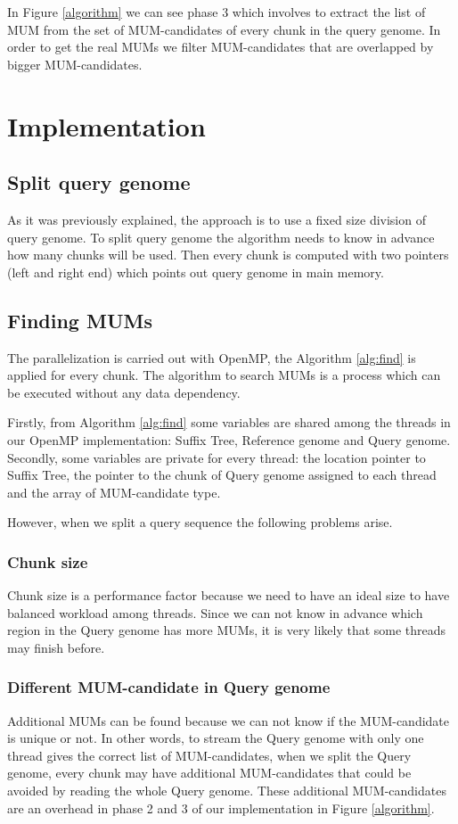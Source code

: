 \documentclass[conference]{IEEEtran}
\begin{document}
In Figure \ref{algorithm} we can see phase 3 which involves to extract the list of MUM from the set of MUM-candidates of every chunk in the query genome. In order to get the real MUMs we filter MUM-candidates that are overlapped by bigger MUM-candidates.
\section{Implementation} 
\label{implementation}
\subsection*{Split query genome}  
As it was previously explained, the approach is to use a fixed size division of query genome. To split query genome the algorithm needs to know in advance how many chunks will be used. Then every chunk is computed with two pointers (left and right end) which points out query genome in main memory.
\subsection*{Finding MUMs}
The parallelization is carried out with OpenMP, the Algorithm \ref{alg:find} is applied for every chunk. The algorithm to search MUMs is a process which can be executed without any data dependency. 

Firstly, from Algorithm \ref{alg:find} some variables are shared among the threads in our OpenMP implementation: Suffix Tree, Reference genome and Query genome. Secondly, some variables are private for every thread: the location pointer to Suffix Tree, the pointer to the chunk of Query genome assigned to each thread and the array of MUM-candidate type.

However, when we split a query sequence the following problems arise.
\subsubsection*{Chunk size}
Chunk size is a performance factor because we need to have an ideal size to have balanced workload among threads. Since we can not know in advance which region in the Query genome has more MUMs, it is very likely that some threads may finish before. 
\subsubsection*{Different MUM-candidate in Query genome}
Additional MUMs can be found because we can not know if the MUM-candidate is unique or not. In other words, to stream the Query genome with only one thread gives the correct list of MUM-candidates, when we split the Query genome, every chunk may have additional MUM-candidates that could be avoided by reading the whole Query genome. These additional MUM-candidates are an overhead in phase 2 and 3 of our implementation in Figure \ref{algorithm}.
\end{document}
